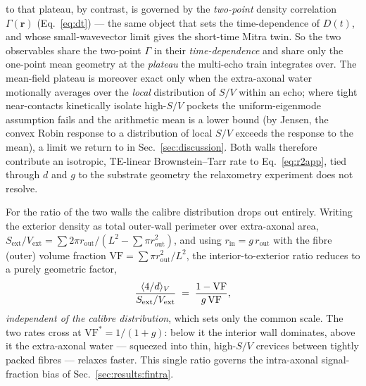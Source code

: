 to that plateau, by contrast, is governed by the \emph{two-point} density correlation
$\Gamma(\mathbf r)$ (Eq.~\eqref{eq:dt}) --- the same object that sets the time-dependence of
$D(t)$, and whose small-wavevector limit gives the short-time Mitra twin. So the two observables
share the two-point $\Gamma$ in their \emph{time-dependence} and share only the one-point mean
geometry at the \emph{plateau} the multi-echo train integrates over. The mean-field plateau is
moreover exact only when the extra-axonal water motionally averages over the \emph{local}
distribution of $S/V$ within an echo; where tight near-contacts kinetically isolate high-$S/V$
pockets the uniform-eigenmode assumption fails and the arithmetic mean is a lower bound (by
Jensen, the convex Robin response to a distribution of local $S/V$ exceeds the response to the
mean), a limit we return to in Sec.~\ref{sec:discussion}. Both walls therefore contribute an
isotropic, TE-linear Brownstein--Tarr rate to Eq.~\eqref{eq:r2app}, tied through $d$ and $g$ to
the substrate geometry the relaxometry experiment does not resolve.

For the ratio of the two walls the calibre distribution drops out entirely. Writing the
exterior density as total outer-wall perimeter over extra-axonal area,
$S_{\mathrm{ext}}/V_{\mathrm{ext}}=\sum 2\pi r_{\mathrm{out}}/(L^2-\sum\pi r_{\mathrm{out}}^2)$,
and using $r_{\mathrm{in}}=g\,r_{\mathrm{out}}$ with the fibre (outer) volume fraction
$\mathrm{VF}=\sum\pi r_{\mathrm{out}}^2/L^2$, the interior-to-exterior ratio reduces to a
purely geometric factor,
\begin{equation}
  \frac{\langle 4/d\rangle_{V}}{S_{\mathrm{ext}}/V_{\mathrm{ext}}}
  \;=\; \frac{1-\mathrm{VF}}{g\,\mathrm{VF}},
  \label{eq:svratio_theory}
\end{equation}
\emph{independent of the calibre distribution}, which sets only the common scale. The two
rates cross at $\mathrm{VF}^{\ast}=1/(1+g)$: below it the interior wall dominates, above it
the extra-axonal water --- squeezed into thin, high-$S/V$ crevices between tightly packed
fibres --- relaxes faster. This single ratio governs the intra-axonal signal-fraction bias
of Sec.~\ref{sec:results:fintra}.
